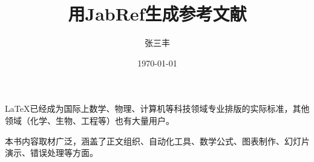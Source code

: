 \documentclass{ctexart}
\title{用JabRef生成参考文献}
\author{张三丰}
\date{\today}
\begin{document}
	\maketitle
	\LaTeX 已经成为国际上数学、物理、计算机等科技领域专业排版的实际标准，其他领域（化学、生物、工程等）也有大量用户\cite{He2017}。
 
	本书内容取材广泛，涵盖了正文组织、自动化工具、数学公式\cite{gougu}、图表制作、幻灯片演示、错误处理等方面\cite{Restoration}。%
	
	\nocite{engelsma2018universal}
	\nocite{Wohleser2013Soybean}
	
\end{document}
